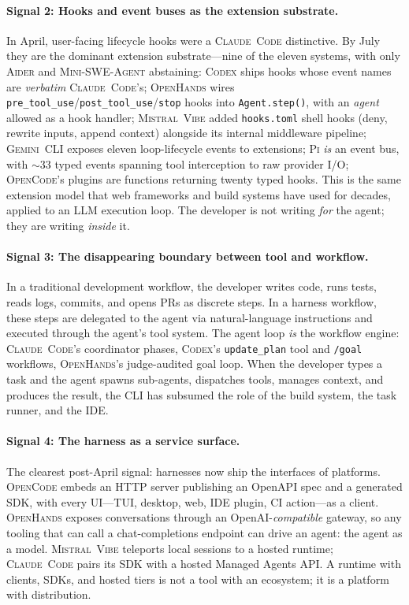 \documentclass[11pt,a4paper]{article}
\newcommand{\clcode}{\textsc{Claude~Code}\xspace}
\newcommand{\cdx}{\textsc{Codex}\xspace}
\newcommand{\oh}{\textsc{OpenHands}\xspace}
\newcommand{\adr}{\textsc{Aider}\xspace}
\newcommand{\mswe}{\textsc{Mini-SWE-Agent}\xspace}
\newcommand{\vibe}{\textsc{Mistral~Vibe}\xspace}
\newcommand{\gemini}{\textsc{Gemini~CLI}\xspace}
\newcommand{\pib}{\textsc{Pi}\xspace}
\newcommand{\ocd}{\textsc{OpenCode}\xspace}
\begin{document}
\paragraph{Signal 2: Hooks and event buses as the extension substrate.}
In April, user-facing lifecycle hooks were a \clcode{} distinctive.
By July they are the dominant extension substrate---nine of the eleven systems, with only \adr{} and \mswe{} abstaining: \cdx{} ships hooks whose event names are \emph{verbatim} \clcode{}'s; \oh{} wires \texttt{pre\_tool\_use}/\texttt{post\_tool\_use}/\texttt{stop} hooks into \texttt{Agent.step()}, with an \emph{agent} allowed as a hook handler; \vibe{} added \texttt{hooks.toml} shell hooks (deny, rewrite inputs, append context) alongside its internal middleware pipeline; \gemini{} exposes eleven loop-lifecycle events to extensions; \pib{} \emph{is} an event bus, with $\sim$33 typed events spanning tool interception to raw provider I/O; \ocd{}'s plugins are functions returning twenty typed hooks.
This is the same extension model that web frameworks and build systems have used for decades, applied to an LLM execution loop.
The developer is not writing \emph{for} the agent; they are writing \emph{inside} it.

\paragraph{Signal 3: The disappearing boundary between tool and workflow.}
In a traditional development workflow, the developer writes code, runs tests, reads logs, commits, and opens PRs as discrete steps.
In a harness workflow, these steps are delegated to the agent via natural-language instructions and executed through the agent's tool system.
The agent loop \emph{is} the workflow engine: \clcode{}'s coordinator phases, \cdx{}'s \texttt{update\_plan} tool and \texttt{/goal} workflows, \oh{}'s judge-audited goal loop.
When the developer types a task and the agent spawns sub-agents, dispatches tools, manages context, and produces the result, the CLI has subsumed the role of the build system, the task runner, and the IDE.

\paragraph{Signal 4: The harness as a service surface.}
The clearest post-April signal: harnesses now ship the interfaces of platforms.
\ocd{} embeds an HTTP server publishing an OpenAPI spec and a generated SDK, with every UI---TUI, desktop, web, IDE plugin, CI action---as a client.
\oh{} exposes conversations through an OpenAI-\emph{compatible} gateway, so any tooling that can call a chat-completions endpoint can drive an agent: the agent as a model.
\vibe{} teleports local sessions to a hosted runtime; \clcode{} pairs its SDK with a hosted Managed Agents API.
A runtime with clients, SDKs, and hosted tiers is not a tool with an ecosystem; it is a platform with distribution.
\end{document}
